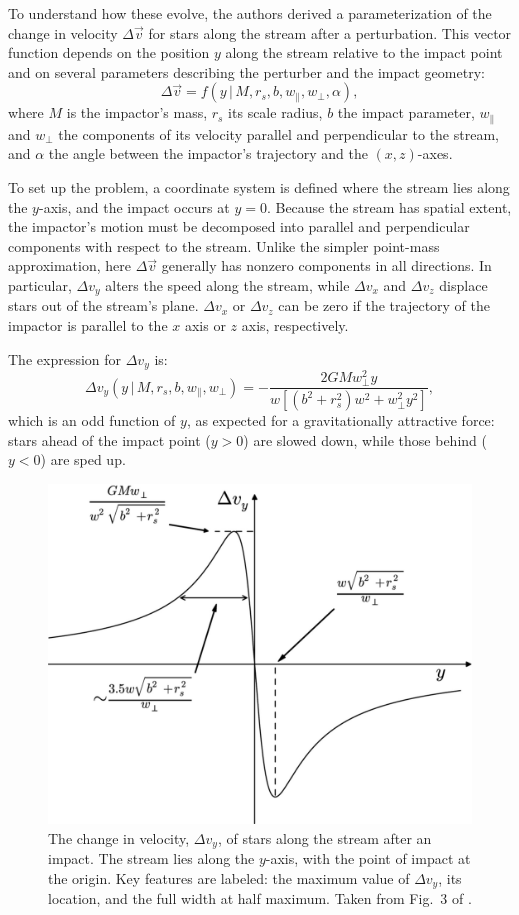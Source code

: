             To understand how these evolve, the authors derived a parameterization of the change in velocity $\Delta \vec{v}$ for stars along the stream after a perturbation. This vector function depends on the position $y$ along the stream relative to the impact point and on several parameters describing the perturber and the impact geometry:
            \[
            \Delta \vec{v} = f(y \,|\, M, r_s, b, w_\parallel, w_\perp, \alpha),
            \]
            where $M$ is the impactor's mass, $r_s$ its scale radius, $b$ the impact parameter, $w_\parallel$ and $w_\perp$ the components of its velocity parallel and perpendicular to the stream, and $\alpha$ the angle between the impactor's trajectory and the $(x,z)$-axes.

            To set up the problem, a coordinate system is defined where the stream lies along the $y$-axis, and the impact occurs at $y=0$. Because the stream has spatial extent, the impactor's motion must be decomposed into parallel and perpendicular components with respect to the stream. Unlike the simpler point-mass approximation, here $\Delta \vec{v}$ generally has nonzero components in all directions. In particular, $\Delta v_y$ alters the speed along the stream, while $\Delta v_x$ and $\Delta v_z$ displace stars out of the stream's plane. $\Delta v_x$ or $\Delta v_z$ can be zero if the trajectory of the impactor is parallel to the $x$ axis or $z$ axis, respectively. 

            The expression for $\Delta v_y$ is:
            \[
            \Delta v_y\left(y\,|\, M, r_s, b, w_\parallel, w_\perp\right) = - \frac{2GM w_\perp^2 y}{w\left[\left(b^2 + r_s^2\right)w^2 + w_\perp^2 y^2\right]},
            \]
            which is an odd function of $y$, as expected for a gravitationally attractive force: stars ahead of the impact point ($y>0$) are slowed down, while those behind ($y<0$) are sped up.
            \begin{figure}
                \centering
                \includegraphics[width=0.5\linewidth]{images/erkal_et_al_2015_fig_3.png}
                \caption{The change in velocity, $\Delta v_y$, of stars along the stream after an impact. The stream lies along the $y$-axis, with the point of impact at the origin. Key features are labeled: the maximum value of $\Delta v_y$, its location, and the full width at half maximum. Taken from Fig.~3 of \citet{2015MNRAS.450.1136E}.}
                \label{fig:erkal_2015_fig_3}
            \end{figure}

